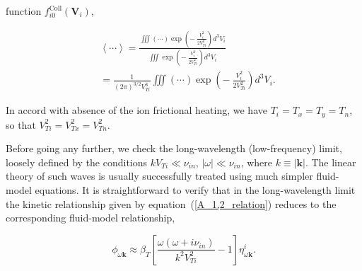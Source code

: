 \documentclass[draft]{agujournal2019}
\renewcommand{\vec}{\mathbf}
\begin{document}
{function $f_{i0}^{\mathrm{Coll}}(\vec{V}_{i})$,
\begin{linenomath*}
\begin{align}
&  \left\langle \cdots\right\rangle =\frac{\iiint(\cdots)\exp\left(
-\ \frac{V_{i}^{2}}{2V_{Ti}^{2}}\right)  d^{3}V_{i}}{\iiint\exp\left(
-\ \frac{V_{i}^{2}}{2V_{Ti}^{2}}\right)  d^{3}V_{i}}\nonumber\\
&  =\frac{1}{\left(  2\pi\right)  ^{3/2}V_{Ti}^{3}}\iiint(\cdots)\exp\left(
-\ \frac{V_{i}^{2}}{2V_{Ti}^{2}}\right)  d^{3}V_{i}. 
\label{<...>}
\end{align}
\end{linenomath*}
In accord with absence of the ion frictional heating, we have $T_{i}%
=T_{x}=T_{y}=T_{n}$, so that $V_{Ti}^{2}=V_{Tx}^{2}
=V_{Tn}^{2}$.

Before going any further, we check the long-wavelength (low-frequency) 
limit, loosely defined by the conditions $kV_{Ti}\ll\nu_{in}$,
$|\omega| \ll\nu_{in}$, where $k\equiv|\vec{k}|$. The
linear theory of such waves is usually successfully treated using much simpler fluid-model
equations. It is straightforward to verify that in the long-wavelength limit
the kinetic relationship given by equation~(\ref{A_1,2_relation}) reduces to
the corresponding fluid-model relationship,
\begin{linenomath*}
\begin{equation}
\phi_{\omega\vec{k}}\approx\beta_{T}\left[  \frac{\omega\left(  \omega
+i\nu_{in}\right)  }{k^{2}V_{Ti}^{2}}-1\right]  \eta_{\omega\vec{k}}^{i}.
\label{fluid_model_classical}
\end{equation}
\end{linenomath*}

}
\end{document}
